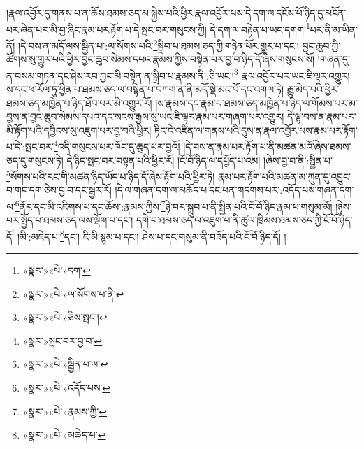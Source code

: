 །རྣལ་འབྱོར་དུ་གནས་པ་ན་ཆོས་ཐམས་ཅད་མ་སྐྱེས་པའི་ཕྱིར་རྣལ་འབྱོར་པས་དེ་དག་ལ་དངོས་པོ་ཉིད་དུ་མངོན་པར་ཞེན་པར་མི་བྱ་ཞིང་རྣམ་པར་རྟོག་པ་དེ་སྤང་བར་གསུངས་ཀྱི། དེ་དག་ལ་བརྟེན་པ་ཡང་དགག་\footnote{«སྣར་»«པེ་»དག་}པར་ནི་མ་ཡིན་ནོ། །དེ་བས་ན་མདོ་ལས་སྦྱིན་པ་:ལ་སོགས་པའི་\footnote{«སྣར་»«པེ་»ལ་སོགས་པ་ནི་}སྒྲིབ་པ་ཐམས་ཅད་ཀྱི་གཉེན་པོར་གྱུར་པ་དང་། བྱང་ཆུབ་ཀྱི་ཚོགས་སུ་གྱུར་པའི་ཕྱིར་བྱང་ཆུབ་སེམས་དཔའ་རྣམས་ཀྱིས་བསྟེན་པར་བྱ་བ་ཉིད་དོ་ཞེས་གསུངས་སོ། །གཞན་དུ་ན་བསམ་གཏན་དང་ཤེས་རབ་ཀྱང་མི་བསྟེན་ན་སྒྲིབ་པ་རྣམས་ནི་:ཅི་ཡང་།\footnote{«སྣར་»«པེ་»ཅིས་སྤང་།} རྣལ་འབྱོར་པར་ཡང་ཇི་ལྟར་འགྱུར། ས་དང་ཕ་རོལ་ཏུ་ཕྱིན་པ་ཐམས་ཅད་ལ་བསྟེན་པ་བཀག་ན་ནི་མདོ་སྡེ་མང་པོ་དང་འགལ་ཏེ། རྒྱུ་མེད་པའི་ཕྱིར་ཐམས་ཅད་མཁྱེན་པ་ཉིད་ཐོབ་པར་མི་འགྱུར་རོ། །ས་རྣམས་དང་རྣམ་པ་ཐམས་ཅད་མཁྱེན་པ་ཉིད་ལ་གོམས་པར་མ་བྱས་ན་བྱང་ཆུབ་སེམས་དཔའ་དང་སངས་རྒྱས་སུ་ཡང་ཇི་ལྟར་རྣམ་པར་གཞག་པར་འགྱུར། དེ་ལྟ་བས་ན་རྣམ་པར་མི་རྟོག་པའི་དབྱིངས་སུ་འཇུག་པར་བྱ་བའི་ཕྱིར། ཏིང་ངེ་འཛིན་ལ་གནས་པའི་དུས་ན་རྣལ་འབྱོར་པས་རྣམ་པར་རྟོག་པ་དེ་:སྤང་བར་\footnote{«སྣར་»སྤང་བར་བྱ་བ་}འདི་གསུངས་པར་ཁོང་དུ་ཆུད་པར་བྱའོ། །དེ་བས་ན་རྣམ་པར་རྟོག་པ་ནི་མཚན་མའོ་ཞེས་ཐམས་ཅད་དུ་གསུངས་ཏེ། དེ་ཉིད་སྤང་བར་བསྟན་པའི་ཕྱིར་རོ། །ངོ་བོ་ཉིད་ལ་དཔྱོད་པ་འམ། །ཞེས་བྱ་བ་ནི་:སྦྱིན་པ་\footnote{«སྣར་»«པེ་»སྦྱིན་པ་ལ་}སོགས་པའི་རང་གི་མཚན་ཉིད་ཡོད་པ་ཉིད་དོ་ཞེས་རྟོག་པའི་ཕྱིར་ཏེ། རྣམ་པར་རྟོག་པའི་མཚན་མ་ཀུན་དུ་འབྱུང་བ་གང་དག་ཅེས་བྱ་བ་དང་སྦྱར་རོ། །དེ་ལ་གཞན་དག་ལ་མཆོད་པ་དང་ཕན་གདགས་པར་:འདོད་པས་གཞན་དག་ལ་\footnote{«སྣར་»«པེ་»འདོད་པས་}ནོར་དང་མི་འཇིགས་པ་དང་ཆོས་:རྣམས་ཀྱིས་\footnote{«སྣར་»«པེ་»རྣམས་ཀྱི་}ཉེ་བར་སྒྲུབ་པ་ནི་སྦྱིན་པའི་ངོ་བོ་ཉིད་རྣམ་པ་གསུམ་མོ། །ཉེས་པར་སྤྱོད་པ་ཐམས་ཅད་ལས་ལྡོག་པ་དང་། དགེ་བ་ཐམས་ཅད་ལ་འཇུག་པ་ནི་ཚུལ་ཁྲིམས་ཐམས་ཅད་ཀྱི་ངོ་བོ་ཉིད་དོ། །མི་:མཇེད་པ་\footnote{«སྣར་»«པེ་»མཆེད་པ་}དང་། ཇི་མི་སྙམ་པ་དང་། ཤེས་པ་དང་གསུམ་ནི་བཟོད་པའི་ངོ་བོ་ཉིད་དོ། །
